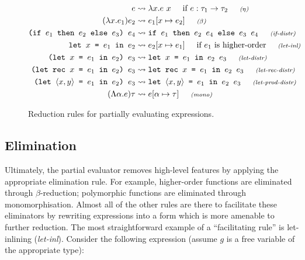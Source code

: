 \documentclass[runningheads]{llncs}
\begin{document}
\begin{figure*}[h]

  \begin{minipage}[c]{\textwidth}
    \begin{align*}
      e &\leadsto \lambda x. e\ x \hskip 0.5cm \text{if $e : \tau_1 \rightarrow \tau_2$} \textit{\hskip 0.5cm\scriptsize ($\eta$)}\\
      (\lambda x. e_1) e_2 &\leadsto e_1[x \mapsto e_2]  \textit{\hskip 0.5cm\scriptsize ($\beta$)}\\
      \texttt{(if $e_1$ then $e_2$ else $e_3$) $e_4$} &\leadsto \texttt{if $e_1$ then $e_2$ $e_4$ else $e_3$ $e_4$}\textit{\hskip 0.5cm\scriptsize (if-distr)} \\
      \texttt{let $x$ = $e_1$ in $e_2$} &\leadsto e_2[x \mapsto e_1] \hskip 0.5cm \text{if $e_1$ is higher-order} \textit{\hskip 0.5cm\scriptsize (let-inl)} \\
      \texttt{(let $x$ = $e_1$ in $e_2$) $e_3$} &\leadsto \texttt{let $x$ = $e_1$ in $e_2$ $e_3$}\textit{\hskip 0.5cm\scriptsize (let-distr)} \\
      \texttt{(let rec $x$ = $e_1$ in $e_2$) $e_3$} &\leadsto \texttt{let rec $x$ = $e_1$ in $e_2$ $e_3$}\textit{\hskip 0.5cm\scriptsize (let-rec-distr)} \\
      \texttt{(let $\langle x , y \rangle$ = $e_1$ in $e_2$) $e_3$} &\leadsto \texttt{let $\langle x , y \rangle$ = $e_1$ in $e_2$ $e_3$}\textit{\hskip 0.5cm\scriptsize (let-prod-distr)} \\
      (\Lambda \alpha. e) \tau &\leadsto e[\alpha \mapsto \tau] \textit{\hskip 0.5cm\scriptsize (mono)}
    \end{align*}
  \end{minipage}

  \caption{Reduction rules for partially evaluating expressions.}
  \label{fig:pe-expr-rules}
\end{figure*}

\subsection{Elimination}

Ultimately, the partial evaluator removes high-level features by applying the appropriate elimination rule. For example, higher-order functions are eliminated through $\beta$-reduction; polymorphic functions are eliminated through monomorphisation. Almost all of the other rules are there to facilitate these eliminators by rewriting expressions into a form which is more amenable to further reduction. The most straightforward example of a ``facilitating rule'' is let-inlining (\textit{let-inl}). Consider the following expression (assume $g$ is a free variable of the appropriate type):
\end{document}
